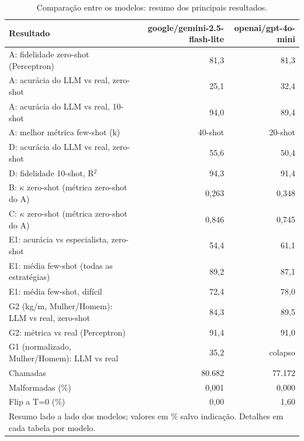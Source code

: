 \begin{table}[htbp]
\centering
\small
\caption{Comparação entre os modelos: resumo dos principais resultados.}
\label{tab:final_comparacao_modelos}
\begin{tabular}{lrr}
\toprule
Resultado & google/gemini-2.5-flash-lite & openai/gpt-4o-mini \\
\midrule
A: fidelidade zero-shot (Perceptron) & 81,3 & 81,3 \\
A: acurácia do LLM vs real, zero-shot & 25,1 & 32,4 \\
A: acurácia do LLM vs real, 10-shot & 94,0 & 89,4 \\
A: melhor métrica few-shot (k) & 40-shot & 20-shot \\
D: acurácia do LLM vs real, zero-shot & 55,6 & 50,4 \\
D: fidelidade 10-shot, R$^2$ & 94,3 & 91,4 \\
B: $\kappa$ zero-shot (métrica zero-shot do A) & 0,263 & 0,348 \\
C: $\kappa$ zero-shot (métrica zero-shot do A) & 0,846 & 0,745 \\
E1: acurácia vs especialista, zero-shot & 54,4 & 61,1 \\
E1: média few-shot (todas as estratégias) & 89,2 & 87,1 \\
E1: média few-shot, difícil & 72,4 & 78,0 \\
G2 (kg/m, Mulher/Homem): LLM vs real, zero-shot & 84,3 & 89,5 \\
G2: métrica vs real (Perceptron) & 91,4 & 91,0 \\
G1 (normalizado, Mulher/Homem): LLM vs real & 35,2 & colapso \\
Chamadas & 80.682 & 77.172 \\
Malformadas (\%) & 0,001 & 0,000 \\
Flip a T=0 (\%) & 0,00 & 1,60 \\
\bottomrule
\multicolumn{3}{p{0.95\linewidth}}{\footnotesize Resumo lado a lado dos modelos; valores em \% salvo indicação. Detalhes em cada tabela por modelo.} \\
\end{tabular}
\end{table}
